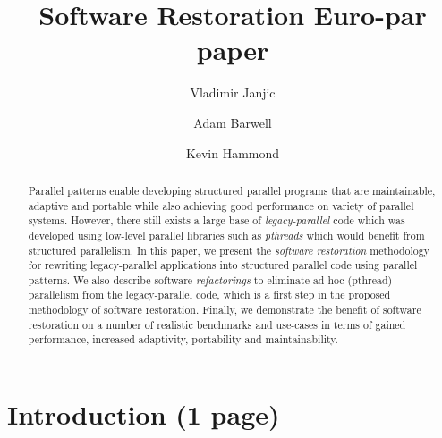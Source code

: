 \documentclass{llncs}
\begin{document}
\title{Software Restoration Euro-par paper}


\author{Vladimir Janjic \and Adam Barwell \and Kevin Hammond}


\maketitle


\begin{abstract}
    Parallel patterns enable developing structured parallel programs that are maintainable, adaptive and portable while also achieving good performance on variety of parallel systems. However, there still exists a large base of \emph{legacy-parallel} code which was developed using low-level parallel libraries such as \emph{pthreads} which would benefit from structured parallelism. In this paper, we present the \emph{software restoration} methodology for rewriting legacy-parallel applications into structured parallel code using parallel patterns. We also describe software \emph{refactorings} to eliminate ad-hoc (pthread) parallelism from the legacy-parallel code, which is a first step in the proposed methodology of software restoration. Finally, we demonstrate the benefit of software restoration on a number of realistic benchmarks and use-cases in terms of gained performance, increased adaptivity, portability and maintainability. 
\end{abstract}


\section{Introduction (1 page)}


\end{document}
